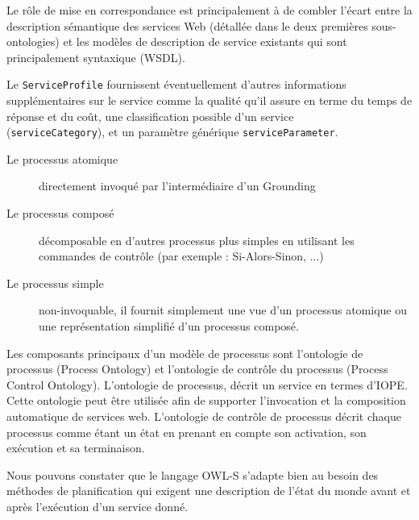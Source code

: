 \begin{description}
      Le rôle de mise en correspondance est principalement à de
      combler l'écart entre la description sémantique des services Web
      (détallée dans le deux premières sous-ontologies) et les
      modèles de description de service existants qui sont
      principalement syntaxique (\textsc{WSDL}).
    \end{description}

    Le \verb|ServiceProfile| fournissent éventuellement d'autres
    informations supplémentaires sur le service comme la qualité
    qu'il assure en terme du temps de réponse et du coût, une
    classification possible d'un service \\(\verb|serviceCategory|),
    et un paramètre générique \verb|serviceParameter|.
    \\
    {\color{red}

      \begin{description}
      \item[Le processus atomique] directement invoqué par
        l’intermédiaire d’un Grounding
      \item[Le processus composé] décomposable en d’autres processus
        plus simples en utilisant les commandes de contrôle (par
        exemple : Si-Alors-Sinon, ...)

      \item[Le processus simple] non-invoquable, il fournit simplement
        une vue d’un processus atomique ou une représentation
        simplifié d’un processus composé.
      \end{description}

      Les composants principaux d’un modèle de processus sont
      l’ontologie de processus (Process Ontology) et l’ontologie de
      contrôle du processus (Process Control Ontology).  L’ontologie
      de processus, décrit un service en termes d’IOPE. Cette
      ontologie peut être utilisée afin de supporter l’invocation et
      la composition automatique de services web.  L’ontologie de
      contrôle de processus décrit chaque processus comme étant un
      état en prenant en compte son activation, son exécution et sa
      terminaison.

      Nous pouvons constater que le langage OWL-S s'adapte bien au
      besoin des méthodes de planification qui exigent une description
      de l’état du monde avant et après l’exécution d’un service donné.

}
